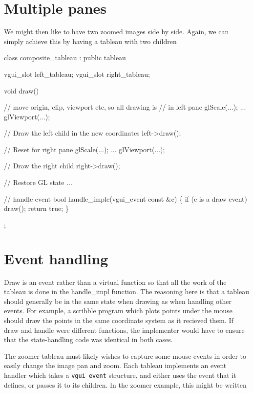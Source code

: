 \documentclass[12pt]{report} \usepackage{epsfig}
\begin{document}
\section{Multiple panes}

We might then like to have two zoomed images side by side.  Again, we can
simply achieve this by having a tableau with two children

{\scriptsize \begin{verbawf}
  class composite\_tableau : public tableau {
    vgui_slot left_tableau;
    vgui_slot right_tableau;

    void draw() {
      //  move origin, clip, viewport etc, so all drawing is
      //  in left pane
      glScale(...);
      ...
      glViewport(...);

      //  Draw the left child in the new coordinates
      left->draw();

      //  Reset for right pane
      glScale(...);
      ...
      glViewport(...);

      //  Draw the right child
      right->draw();

      //  Restore GL state
      ...
    }

    // handle event
    bool handle_imple(vgui_event const &e)
    \{
      if (e is a draw event)
        draw();
      return true;
    \}
  };
\end{verbawf}}

\section{Event handling}

Draw is an event rather than a virtual function so that
all the work of the tableau is done in the handle\_impl function.
The reasoning here is that a tableau should generally be in the same
state when drawing as when handling other events.  For example, a scribble
program which plots points under the mouse should draw the points in
the same coordinate system as it recieved them.   If draw and handle
were different functions, the implementer would have to ensure that
the state-handling code was identical in both cases.

The zoomer tableau must likely wishes to capture some mouse events in order
to easily change the image pan and zoom.  Each tableau implements an event
handler which takes a {\tt vgui\_event} structure, and either uses
the event that it defines, or passes it to its children.  In the zoomer
example, this might be written
\end{document}
